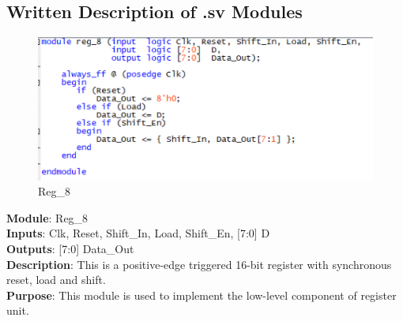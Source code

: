 \documentclass[12pt]{article}
\begin{document}
\subsection{Written Description of .sv Modules}
\begin{figure}[H]
    \centering
    \includegraphics[width=15cm]{reg8.png}
    \caption{Reg\_8}
\end{figure}
\textbf{Module}: Reg\_8 \\ 
\textbf{Inputs}: Clk, Reset, Shift\_In, Load, Shift\_En, [7:0] D \\ 
\textbf{Outputs}: [7:0] Data\_Out \\ 
\textbf{Description}: This is a positive-edge triggered 16-bit register with synchronous reset, load and shift. \\ 
\textbf{Purpose}: This module is used to implement the low-level component of register unit. \\
\end{document}
